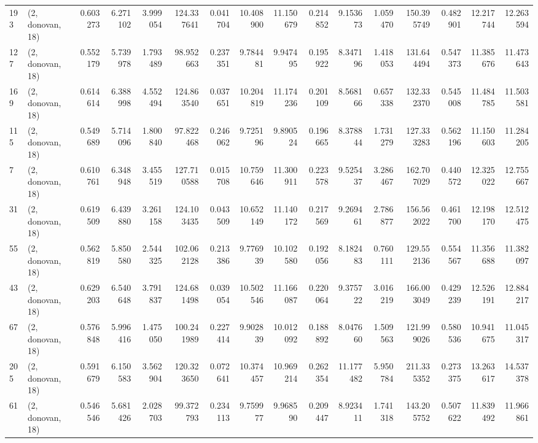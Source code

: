 \begin{tabular}{llrrrrrrrrrrrrrr}
193 &  (2, donovan, 18) &   0.603273 &   6.271102 &   3.999054 &   124.337641 &   0.041704 &  10.408900 &  11.150679 &  0.214852 &   9.153673 &   1.059470 &   150.395749 &  0.482901 &  12.217744 &  12.263594 \\
127 &  (2, donovan, 18) &   0.552179 &   5.739978 &   1.793489 &    98.952663 &   0.237351 &   9.784481 &   9.947495 &  0.195922 &   8.347196 &   1.418053 &   131.644494 &  0.547373 &  11.385676 &  11.473643 \\
169 &  (2, donovan, 18) &   0.614614 &   6.388998 &   4.552494 &   124.863540 &   0.037651 &  10.204819 &  11.174236 &  0.201109 &   8.568166 &   0.657338 &   132.332370 &  0.545008 &  11.484785 &  11.503581 \\
115 &  (2, donovan, 18) &   0.549689 &   5.714096 &   1.800840 &    97.822468 &   0.246062 &   9.725196 &   9.890524 &  0.196665 &   8.378844 &   1.731279 &   127.333283 &  0.562196 &  11.150603 &  11.284205 \\
7   &  (2, donovan, 18) &   0.610761 &   6.348948 &   3.455519 &   127.710588 &   0.015708 &  10.759646 &  11.300911 &  0.223578 &   9.525437 &   3.286467 &   162.707029 &  0.440572 &  12.325022 &  12.755667 \\
31  &  (2, donovan, 18) &   0.619509 &   6.439880 &   3.261158 &   124.103435 &   0.043509 &  10.652149 &  11.140172 &  0.217569 &   9.269461 &   2.786877 &   156.562022 &  0.461700 &  12.198170 &  12.512475 \\
55  &  (2, donovan, 18) &   0.562819 &   5.850580 &   2.544325 &   102.062128 &   0.213386 &   9.776939 &  10.102580 &  0.192056 &   8.182483 &   0.760111 &   129.552136 &  0.554567 &  11.356688 &  11.382097 \\
43  &  (2, donovan, 18) &   0.629203 &   6.540648 &   3.791837 &   124.681498 &   0.039054 &  10.502546 &  11.166087 &  0.220064 &   9.375722 &   3.016219 &   166.003049 &  0.429239 &  12.526191 &  12.884217 \\
67  &  (2, donovan, 18) &   0.576848 &   5.996416 &   1.475050 &   100.241989 &   0.227414 &   9.902839 &  10.012092 &  0.188892 &   8.047660 &   1.509563 &   121.999026 &  0.580536 &  10.941675 &  11.045317 \\
205 &  (2, donovan, 18) &   0.591679 &   6.150583 &   3.562904 &   120.323650 &   0.072641 &  10.374457 &  10.969214 &  0.262354 &  11.177482 &   5.950784 &   211.335352 &  0.273375 &  13.263617 &  14.537378 \\
61  &  (2, donovan, 18) &   0.546546 &   5.681426 &   2.028703 &    99.372793 &   0.234113 &   9.759977 &   9.968590 &  0.209447 &   8.923411 &   1.741318 &   143.205752 &  0.507622 &  11.839492 &  11.966861 \\

\end{tabular}
